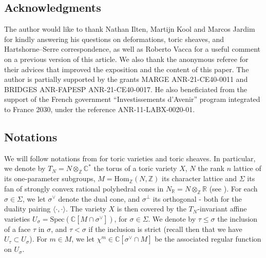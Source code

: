 \documentclass[a4paper,10pt]{amsart}
\theoremstyle{plain}{
    \newtheorem{theorem}{Theorem}[section]
    \newtheorem{lemma}[theorem]{Lemma}
    \newtheorem{corollary}[theorem]{Corollary}
    \newtheorem{proposition}[theorem]{Proposition}
    \newtheorem{conjecture}[theorem]{Conjecture}
}
\theoremstyle{definition}{
    \newtheorem{definition}[theorem]{Definition}
    \newtheorem{defn-thm}[theorem]{Definition-Theorem}
    \newtheorem{example}[theorem]{Example}
    \newtheorem{notation}[theorem]{Notation}
}
\theoremstyle{remark}{
    \newtheorem{remark}[theorem]{Remark}
    \newtheorem{problem}[theorem]{Problem}
    \newtheorem{question}[theorem]{Question}
}
\def\R{\mathbb{R}}
\def\Z{\mathbb{Z}}
\def\C{\mathbb{C}}
\def\Hom{\mathrm{Hom}}
\def\Spec{\mathrm{Spec}}
\begin{document}
\subsection*{Acknowledgments}  
The author would like to thank Nathan Ilten, Martijn Kool and Marcos Jardim for kindly answering his questions on deformations, toric sheaves, and Hartshorne--Serre correspondence, as well as Roberto Vacca for a useful comment on a previous version of this article. We also thank the anonymous referee for their advices that improved the exposition and the content of this
paper. The author is partially supported by the grants MARGE ANR-21-CE40-0011 and BRIDGES ANR-FAPESP ANR-21-CE40-0017. He also beneficiated from the support of the French government “Investissements d'Avenir” program integrated to France 2030, under the reference ANR-11-LABX-0020-01.

\subsection*{Notations}
We will follow notations from \cite{CLS,Per04} for toric varieties and toric sheaves. In particular, we denote by $T_N=N\otimes_\Z \C^*$ the torus of a toric variety $X$, $N$ the rank $n$ lattice of its one-parameter subgroups, $M=\Hom_\Z(N,\Z)$ its character lattice and $\Sigma$ its fan of strongly convex rational polyhedral cones in $N_\R=N\otimes_\Z \R$ (see \cite[Chapter 3]{CLS}). For each $\sigma\in\Sigma$, we let $\sigma^\vee$ denote the dual cone, and $\sigma^\perp$ its orthogonal - both for the duality pairing $\langle\cdot,\cdot\rangle$. 
The variety $X$ is then covered by the $T_N$-invariant affine varieties $U_\sigma=\Spec(\C[M\cap\sigma^\vee])$, for $\sigma\in \Sigma$. We denote by $\tau\leq\sigma$ the inclusion of a face $\tau$ in $\sigma$, and $\tau<\sigma$ if the inclusion is strict (recall then that we have $U_\tau\subset U_\sigma$).  For $m\in M$, we let $\chi^m\in\C[\sigma^\vee\cap M]$ be the associated regular function on $U_\sigma$.
\end{document}
